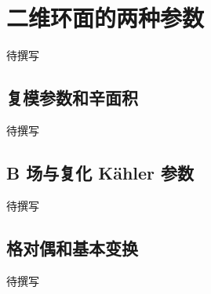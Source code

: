 
% 
% 

\section{二维环面的两种参数}
\label{g4:sec:3301}

待撰写

\subsection{复模参数和辛面积}
\label{g4:subsec:3301:01}
待撰写

\subsection{B 场与复化 Kähler 参数}
\label{g4:subsec:3301:02}
待撰写

\subsection{格对偶和基本变换}
\label{g4:subsec:3301:03}
待撰写
